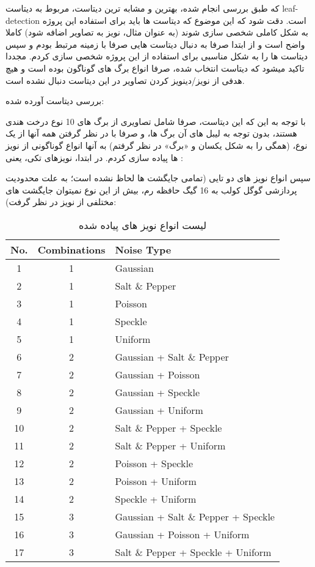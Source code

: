 \documentclass[a4paper,12pt]{article}
\begin{document}
که طبق بررسی انجام شده، بهترین و مشابه ترین دیتاست، مربوط به دیتاست leaf-detection است. 
دقت شود که این موضوع که دیتاست ها باید برای استفاده این پروژه به شکل کاملی شخصی سازی شوند (به عنوان مثال، نویز به تصاویر اضافه شود) کاملا واضح است و از ابتدا صرفا به دنبال دیتاست هایی صرفا با زمینه مرتبط بودم و سپس دیتاست ها را به شکل مناسبی برای استفاده از این پروژه شخصی سازی کردم. مجددا تاکید میشود که دیتاست انتخاب شده، صرفا انواع برگ های گوناگون بوده است و هیچ هدفی از نویز/دینویز کردن تصاویر در این دیتاست دنبال نشده است. 

بررسی دیتاست آورده شده:

با توجه به این که این دیتاست، صرفا شامل تصاویری از برگ های 10 نوع درخت هندی هستند، بدون توجه به لیبل های آن برگ ها، و صرفا با در نظر گرفتن همه آنها از یک نوع، (همگی را به شکل یکسان و «برگ» در نظر گرفتم) به آنها انواع گوناگونی از نویز ها پیاده سازی کردم. در ابتدا، نویزهای تکی، یعنی :

سپس انواع نویز های دو تایی (تمامی جایگشت ها لحاظ نشده است؛ به علت محدودیت پردازشی گوگل کولب به 16 گیگ حافظه رم، بیش از این نوع نمیتوان جایگشت های مختلفی از نویز در نظر گرفت):

\pagebreak

\begin{table}[h]
	\centering
	\begin{latin}
	\begin{tabular}{|c|c|l|}
		\hline
		\textbf{No.} & \textbf{Combinations} & \textbf{Noise Type} \\
		\hline
		1 & 1 & Gaussian \\
		\hline
		2 & 1 & Salt \& Pepper \\
		\hline
		3 & 1 & Poisson \\
		\hline
		4 & 1 & Speckle \\
		\hline
		5 & 1 & Uniform \\
		\hline
		6 & 2 & Gaussian + Salt \& Pepper \\
		\hline
		7 & 2 & Gaussian + Poisson \\
		\hline
		8 & 2 & Gaussian + Speckle \\
		\hline
		9 & 2 & Gaussian + Uniform \\
		\hline
		10 & 2 & Salt \& Pepper + Speckle \\
		\hline
		11 & 2 & Salt \& Pepper + Uniform \\
		\hline
		12 & 2 & Poisson + Speckle \\
		\hline
		13 & 2 & Poisson + Uniform \\
		\hline
		14 & 2 & Speckle + Uniform \\
		\hline
		15 & 3 & Gaussian + Salt \& Pepper + Speckle \\
		\hline
		16 & 3 & Gaussian + Poisson + Uniform \\
		\hline
		17 & 3 & Salt \& Pepper + Speckle + Uniform \\
		\hline
	\end{tabular}
	\end{latin}
	\caption{لیست انواع نویز های پیاده شده}
\end{table}
	
\end{document}
